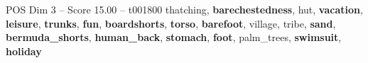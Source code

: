 \begin{textsample}{POS Dim 3 – Score 15.00 – t001800}  \label{ex:f3_pos_028}
thatching, \textbf{barechestedness}, hut, \textbf{vacation}, \textbf{leisure}, \textbf{trunks}, \textbf{fun}, \textbf{boardshorts}, \textbf{torso}, \textbf{barefoot}, village, tribe, \textbf{sand}, \textbf{bermuda\_shorts}, \textbf{human\_back}, \textbf{stomach}, \textbf{foot}, palm\_trees, \textbf{swimsuit}, \textbf{holiday}

\end{textsample}
